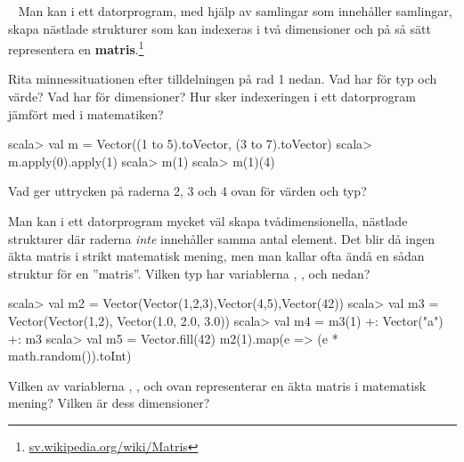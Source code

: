 \TaskSolved \what

\begin{ConceptConnections}

\end{ConceptConnections}

\QUESTEND





\QUESTBEGIN

\Task  \what~  Man kan i ett datorprogram, med hjälp av samlingar som innehåller samlingar, skapa nästlade strukturer som kan indexeras i två dimensioner och på så sätt representera en  \textbf{matris}.\footnote{\href{https://sv.wikipedia.org/wiki/Matris}{sv.wikipedia.org/wiki/Matris}}

\Subtask Rita minnessituationen efter tilldelningen på rad 1 nedan. Vad har  för typ och värde? Vad har  för dimensioner? Hur sker indexeringen i ett datorprogram jämfört med i matematiken?

\begin{REPL}
scala> val m = Vector((1 to 5).toVector, (3 to 7).toVector)
scala> m.apply(0).apply(1)
scala> m(1)
scala> m(1)(4)
\end{REPL}

\Subtask Vad ger uttrycken på raderna 2, 3 och 4 ovan för värden och typ?

\Subtask Man kan i ett datorprogram mycket väl skapa tvådimensionella, nästlade strukturer där raderna \emph{inte} innehåller samma antal element. Det blir då ingen äkta matris i strikt matematisk mening, men man kallar ofta ändå en sådan struktur för en ''matris''. Vilken typ har variablerna , ,  och  nedan?

\begin{REPL}
scala> val m2 = Vector(Vector(1,2,3),Vector(4,5),Vector(42))
scala> val m3 = Vector(Vector(1,2), Vector(1.0, 2.0, 3.0))
scala> val m4 = m3(1) +: Vector("a") +: m3
scala> val m5 = Vector.fill(42){ m2(1).map(e => (e * math.random()).toInt) }
\end{REPL}

\Subtask Vilken av variablerna , ,  och  ovan representerar en äkta matris i matematisk mening? Vilken är dess dimensioner?

\SOLUTION

\TaskSolved \what

